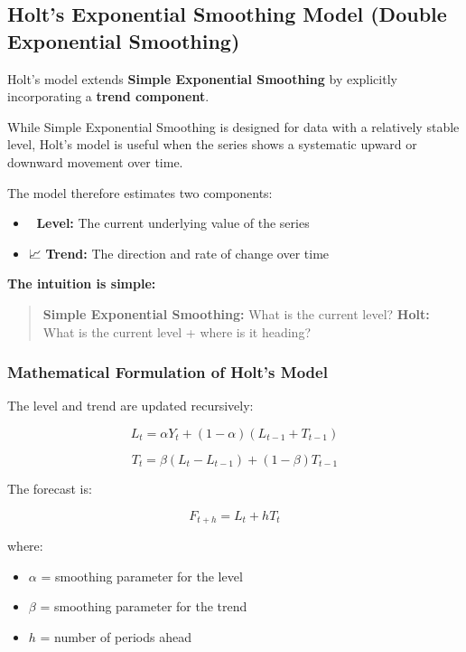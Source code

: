 \documentclass[
  a4paper,
]{article}
\providecommand{\tightlist}{%
  \setlength{\itemsep}{0pt}\setlength{\parskip}{0pt}}
\begin{document}
\subsection{Holt's Exponential Smoothing Model (Double Exponential
Smoothing)}\label{holts-exponential-smoothing-model-double-exponential-smoothing}

Holt's model extends \textbf{Simple Exponential Smoothing} by explicitly
incorporating a \textbf{trend component}.

While Simple Exponential Smoothing is designed for data with a
relatively stable level, Holt's model is useful when the series shows a
systematic upward or downward movement over time.

The model therefore estimates two components:

\begin{itemize}
\tightlist
\item
  📍 \textbf{Level:} The current underlying value of the series\\
\item
  📈 \textbf{Trend:} The direction and rate of change over time
\end{itemize}

\textbf{The intuition is simple:}

\begin{quote}
\textbf{Simple Exponential Smoothing:} What is the current level?
\textbf{Holt:} What is the current level + where is it heading?
\end{quote}

\subsubsection{Mathematical Formulation of Holt's
Model}\label{mathematical-formulation-of-holts-model}

The level and trend are updated recursively:

\[
L_t = \alpha Y_t + (1-\alpha)(L_{t-1}+T_{t-1})
\]

\[
T_t = \beta(L_t-L_{t-1})+(1-\beta)T_{t-1}
\]

The forecast is:

\[
\boxed{F_{t+h}=L_t+hT_t}
\]

where:

\begin{itemize}
\tightlist
\item
  \(\alpha\) = smoothing parameter for the level
\item
  \(\beta\) = smoothing parameter for the trend
\item
  \(h\) = number of periods ahead
\end{itemize}
\end{document}
